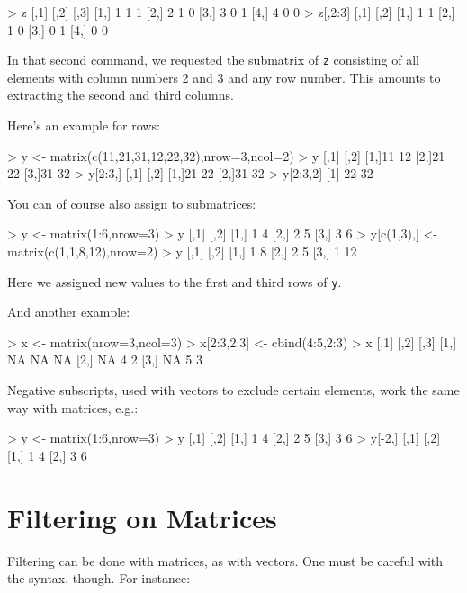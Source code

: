 \begin{Code}
> z
  [,1] [,2] [,3]
[1,] 1    1    1
[2,] 2    1    0
[3,] 3    0    1
[4,] 4    0    0
> z[,2:3]
  [,1] [,2]
[1,] 1    1
[2,] 1    0
[3,] 0    1
[4,] 0    0
\end{Code}

\noindent
In that second command, we requested the submatrix of {\tt z} consisting
of all elements with column numbers 2 and 3 and any row number.  This
amounts to extracting the second and third columns.

Here's an example for rows:

\begin{Code}
> y <- matrix(c(11,21,31,12,22,32),nrow=3,ncol=2)
> y
  [,1] [,2]
[1,]11   12
[2,]21   22
[3,]31   32
> y[2:3,]
  [,1] [,2]
[1,]21   22
[2,]31   32
> y[2:3,2]
[1] 22 32
\end{Code}

You can of course also assign to submatrices:

\begin{Code}
> y <- matrix(1:6,nrow=3)
> y
     [,1] [,2]
[1,]    1    4
[2,]    2    5
[3,]    3    6
> y[c(1,3),] <- matrix(c(1,1,8,12),nrow=2)
> y
     [,1] [,2]
[1,]    1    8
[2,]    2    5
[3,]    1   12
\end{Code}

\noindent
Here we assigned new values to the first and third rows of {\tt y}.

And another example:

\begin{Code}
> x <- matrix(nrow=3,ncol=3)
> x[2:3,2:3] <- cbind(4:5,2:3)
> x  
     [,1] [,2] [,3]
[1,]   NA   NA   NA
[2,]   NA    4    2
[3,]   NA    5    3
\end{Code}

Negative subscripts, used with vectors to exclude certain elements, work
the same way with matrices, e.g.:

\begin{Code}
> y <- matrix(1:6,nrow=3)
> y
     [,1] [,2]
[1,]    1    4
[2,]    2    5
[3,]    3    6
> y[-2,]
     [,1] [,2]
[1,]    1    4
[2,]    3    6
\end{Code}

\section{Filtering on Matrices}

Filtering can be done with matrices, as with vectors.  One must be
careful with the syntax, though.  For instance:

